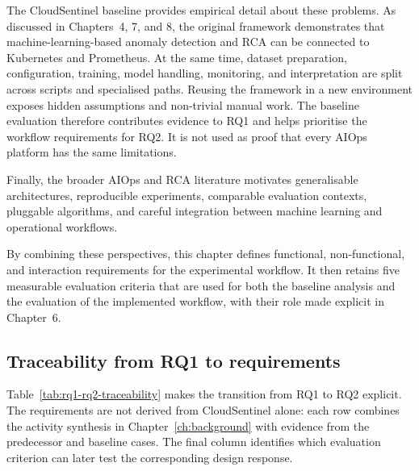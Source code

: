 The CloudSentinel baseline provides empirical detail about these problems. As discussed in Chapters~4, 7, and 8, the original framework demonstrates that machine-learning-based anomaly detection and RCA can be connected to Kubernetes and Prometheus. At the same time, dataset preparation, configuration, training, model handling, monitoring, and interpretation are split across scripts and specialised paths. Reusing the framework in a new environment exposes hidden assumptions and non-trivial manual work. The baseline evaluation therefore contributes evidence to RQ1 and helps prioritise the workflow requirements for RQ2. It is not used as proof that every AIOps platform has the same limitations.

Finally, the broader AIOps and RCA literature motivates generalisable architectures, reproducible experiments, comparable evaluation contexts, pluggable algorithms, and careful integration between machine learning and operational workflows.

By combining these perspectives, this chapter defines functional, non-functional, and interaction requirements for the experimental workflow. It then retains five measurable evaluation criteria that are used for both the baseline analysis and the evaluation of the implemented workflow, with their role made explicit in Chapter~6.

\subsection{Traceability from RQ1 to requirements}

Table~\ref{tab:rq1-rq2-traceability} makes the transition from RQ1 to RQ2 explicit. The requirements are not derived from CloudSentinel alone: each row combines the activity synthesis in Chapter~\ref{ch:background} with evidence from the predecessor and baseline cases. The final column identifies which evaluation criterion can later test the corresponding design response.


